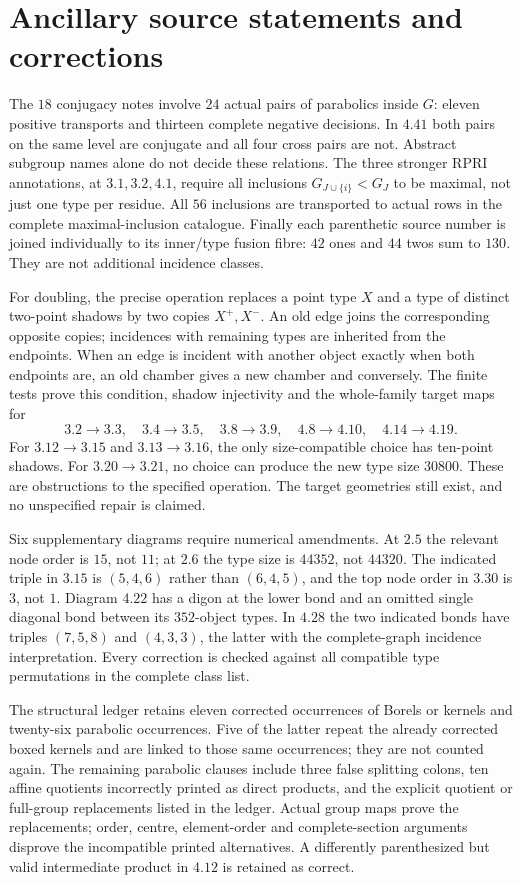 \section{Ancillary source statements and corrections}
The $18$ conjugacy notes involve $24$ actual pairs of parabolics inside
$G$: eleven positive transports and thirteen complete negative
decisions. In $4.41$ both pairs on the same level are conjugate and
all four cross pairs are not. Abstract subgroup names alone do not
decide these relations. The three stronger RPRI annotations, at
$3.1,3.2,4.1$, require all inclusions
$G_{J\cup\{i\}}<G_J$ to be maximal, not just one type per residue.
All $56$ inclusions are transported to actual rows in the complete
maximal-inclusion catalogue. Finally each parenthetic source number
is joined individually to its inner/type fusion fibre: $42$ ones and
$44$ twos sum to $130$. They are not additional incidence classes.

For doubling, the precise operation replaces a point type $X$ and a
type of distinct two-point shadows by two copies $X^+,X^-$. An old edge
joins the corresponding opposite copies; incidences with remaining
types are inherited from the endpoints. When an edge is incident with
another object exactly when both endpoints are, an old chamber gives
a new chamber and conversely. The finite tests prove this condition,
shadow injectivity and the whole-family target maps for
\[
3.2\to3.3,\quad3.4\to3.5,\quad3.8\to3.9,\quad
4.8\to4.10,\quad4.14\to4.19.
\]
For $3.12\to3.15$ and $3.13\to3.16$, the only size-compatible choice
has ten-point shadows. For $3.20\to3.21$, no choice can produce the new
type size $30800$. These are obstructions to the specified operation.
The target geometries still exist, and no unspecified repair is claimed.

Six supplementary diagrams require numerical amendments. At $2.5$ the
relevant node order is $15$, not $11$; at $2.6$ the type size is $44352$,
not $44320$. The indicated triple in $3.15$ is $(5,4,6)$ rather than
$(6,4,5)$, and the top node order in $3.30$ is $3$, not $1$. Diagram
$4.22$ has a digon at the lower bond and an omitted single diagonal
bond between its $352$-object types. In $4.28$ the two indicated bonds
have triples $(7,5,8)$ and $(4,3,3)$, the latter with the complete-graph
incidence interpretation. Every correction is checked against all
compatible type permutations in the complete class list.

The structural ledger retains eleven corrected occurrences of Borels
or kernels and twenty-six parabolic occurrences. Five of the latter repeat the
already corrected boxed kernels and are linked to those same occurrences;
they are not counted again. The remaining parabolic clauses include
three false splitting colons, ten affine quotients incorrectly printed
as direct products, and the explicit quotient or full-group replacements
listed in the ledger. Actual group maps prove the replacements; order,
centre, element-order and complete-section arguments disprove the
incompatible printed alternatives. A differently parenthesized but
valid intermediate product in $4.12$ is retained as correct.

